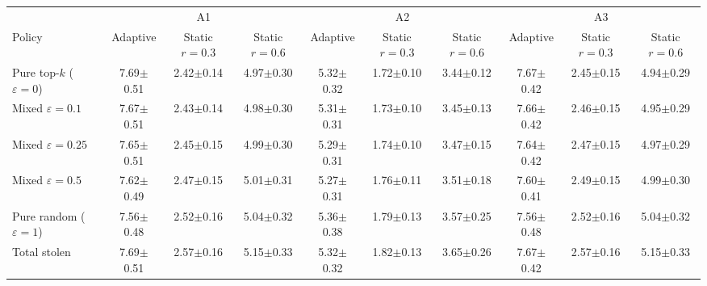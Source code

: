 \begin{tabular}{lccccccccc}
\toprule
 & \multicolumn{3}{c}{A1} & \multicolumn{3}{c}{A2} & \multicolumn{3}{c}{A3} \\
\cmidrule(lr){2-4}\cmidrule(lr){5-7}\cmidrule(lr){8-10}
Policy & Adaptive & Static $r{=}0.3$ & Static $r{=}0.6$ & Adaptive & Static $r{=}0.3$ & Static $r{=}0.6$ & Adaptive & Static $r{=}0.3$ & Static $r{=}0.6$ \\
\midrule
Pure top-$k$ ($\varepsilon{=}0$) & 7.69$\pm$0.51 & 2.42$\pm$0.14 & 4.97$\pm$0.30 & 5.32$\pm$0.32 & 1.72$\pm$0.10 & 3.44$\pm$0.12 & 7.67$\pm$0.42 & 2.45$\pm$0.15 & 4.94$\pm$0.29 \\
Mixed $\varepsilon{=}0.1$ & 7.67$\pm$0.51 & 2.43$\pm$0.14 & 4.98$\pm$0.30 & 5.31$\pm$0.31 & 1.73$\pm$0.10 & 3.45$\pm$0.13 & 7.66$\pm$0.42 & 2.46$\pm$0.15 & 4.95$\pm$0.29 \\
Mixed $\varepsilon{=}0.25$ & 7.65$\pm$0.51 & 2.45$\pm$0.15 & 4.99$\pm$0.30 & 5.29$\pm$0.31 & 1.74$\pm$0.10 & 3.47$\pm$0.15 & 7.64$\pm$0.42 & 2.47$\pm$0.15 & 4.97$\pm$0.29 \\
Mixed $\varepsilon{=}0.5$ & 7.62$\pm$0.49 & 2.47$\pm$0.15 & 5.01$\pm$0.31 & 5.27$\pm$0.31 & 1.76$\pm$0.11 & 3.51$\pm$0.18 & 7.60$\pm$0.41 & 2.49$\pm$0.15 & 4.99$\pm$0.30 \\
Pure random ($\varepsilon{=}1$) & 7.56$\pm$0.48 & 2.52$\pm$0.16 & 5.04$\pm$0.32 & 5.36$\pm$0.38 & 1.79$\pm$0.13 & 3.57$\pm$0.25 & 7.56$\pm$0.48 & 2.52$\pm$0.16 & 5.04$\pm$0.32 \\
\midrule
Total stolen & 7.69$\pm$0.51 & 2.57$\pm$0.16 & 5.15$\pm$0.33 & 5.32$\pm$0.32 & 1.82$\pm$0.13 & 3.65$\pm$0.26 & 7.67$\pm$0.42 & 2.57$\pm$0.16 & 5.15$\pm$0.33 \\
\bottomrule
\end{tabular}
